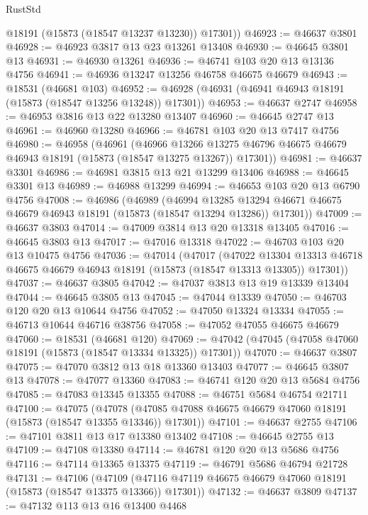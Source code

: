 \begin{lexlean}{RustStd}
\begin{coremodule}
        @18191
        (@15873 (@18547 @13237 @13230))
        @17301))
@46923 := @46637 @3801
@46928 := @46923 @3817 @13 @23 @13261 @13408
@46930 := @46645 @3801 @13
@46931 := @46930 @13261
@46936 := @46741 @103 @20 @13 @13136 @4756
@46941 := @46936 @13247 @13256 @46758 @46675 @46679
@46943 := @18531 (@46681 @103)
@46952 := @46928 (@46931 (@46941 @46943 @18191 (@15873 (@18547 @13256 @13248)) @17301))
@46953 := @46637 @2747
@46958 := @46953 @3816 @13 @22 @13280 @13407
@46960 := @46645 @2747 @13
@46961 := @46960 @13280
@46966 := @46781 @103 @20 @13 @7417 @4756
@46980 := @46958
    (@46961
      (@46966
        @13266
        @13275
        @46796
        @46675
        @46679
        @46943
        @18191
        (@15873 (@18547 @13275 @13267))
        @17301))
@46981 := @46637 @3301
@46986 := @46981 @3815 @13 @21 @13299 @13406
@46988 := @46645 @3301 @13
@46989 := @46988 @13299
@46994 := @46653 @103 @20 @13 @6790 @4756
@47008 := @46986
    (@46989
      (@46994
        @13285
        @13294
        @46671
        @46675
        @46679
        @46943
        @18191
        (@15873 (@18547 @13294 @13286))
        @17301))
@47009 := @46637 @3803
@47014 := @47009 @3814 @13 @20 @13318 @13405
@47016 := @46645 @3803 @13
@47017 := @47016 @13318
@47022 := @46703 @103 @20 @13 @10475 @4756
@47036 := @47014
    (@47017
      (@47022
        @13304
        @13313
        @46718
        @46675
        @46679
        @46943
        @18191
        (@15873 (@18547 @13313 @13305))
        @17301))
@47037 := @46637 @3805
@47042 := @47037 @3813 @13 @19 @13339 @13404
@47044 := @46645 @3805 @13
@47045 := @47044 @13339
@47050 := @46703 @120 @20 @13 @10644 @4756
@47052 := @47050 @13324 @13334
@47055 := @46713 @10644 @46716 @38756
@47058 := @47052 @47055 @46675 @46679
@47060 := @18531 (@46681 @120)
@47069 := @47042 (@47045 (@47058 @47060 @18191 (@15873 (@18547 @13334 @13325)) @17301))
@47070 := @46637 @3807
@47075 := @47070 @3812 @13 @18 @13360 @13403
@47077 := @46645 @3807 @13
@47078 := @47077 @13360
@47083 := @46741 @120 @20 @13 @5684 @4756
@47085 := @47083 @13345 @13355
@47088 := @46751 @5684 @46754 @21711
@47100 := @47075
    (@47078 (@47085 @47088 @46675 @46679 @47060 @18191 (@15873 (@18547 @13355 @13346)) @17301))
@47101 := @46637 @2755
@47106 := @47101 @3811 @13 @17 @13380 @13402
@47108 := @46645 @2755 @13
@47109 := @47108 @13380
@47114 := @46781 @120 @20 @13 @5686 @4756
@47116 := @47114 @13365 @13375
@47119 := @46791 @5686 @46794 @21728
@47131 := @47106
    (@47109 (@47116 @47119 @46675 @46679 @47060 @18191 (@15873 (@18547 @13375 @13366)) @17301))
@47132 := @46637 @3809
@47137 := @47132 @113 @13 @16 @13400 @4468

\end{coremodule}
\end{lexlean}
